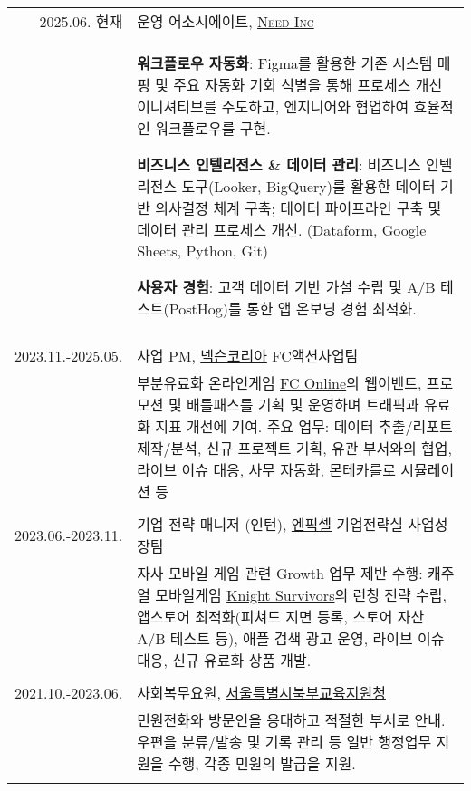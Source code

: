 \documentclass[a4paper]{article} %
\begin{document}
\begin{tabular}{r|p{11cm}}

    \textsc{2025.06.-현재} & 운영 어소시에이트, \href{https://www.need.ai}{\textsc{Need Inc}} \\
    &\footnotesize{\vspace{-2mm}
        \textbf{워크플로우 자동화}: Figma를 활용한 기존 시스템 매핑
        및 주요 자동화 기회 식별을 통해 프로세스 개선 이니셔티브를 주도하고,
        엔지니어와 협업하여 효율적인 워크플로우를 구현.

        \vspace{2mm}

        \textbf{비즈니스 인텔리전스 \& 데이터 관리}: 비즈니스 인텔리전스 도구(Looker, BigQuery)를 활용한
        데이터 기반 의사결정 체계 구축; 데이터 파이프라인 구축 및 데이터 관리 프로세스 개선.
        (Dataform, Google Sheets, Python, Git)

        \vspace{2mm}
        \textbf{사용자 경험}: 고객 데이터 기반 가설 수립 및 A/B 테스트(PostHog)를 통한 앱 온보딩 경험 최적화.
    }\\
    \multicolumn{2}{c}{} \\

    \textsc{2023.11.-2025.05.} & 사업 PM, \href{https://company.nexon.com/ko/}{넥슨코리아} FC액션사업팀 \\
    &\footnotesize{\vspace{-2mm}
        부분유료화 온라인게임 \href{https://fconline.nexon.com}{FC Online}의 웹이벤트, 프로모션 및 배틀패스를
        기획 및 운영하며 트래픽과 유료화 지표 개선에 기여. 
        주요 업무: 데이터 추출/리포트 제작/분석, 신규 프로젝트 기획, 유관 부서와의 협업,
                라이브 이슈 대응, 사무 자동화, 몬테카를로 시뮬레이션 등
    }\\
    \multicolumn{2}{c}{} \\
	
    \textsc{2023.06.-2023.11.} & 기업 전략 매니저 (인턴),
\href{https://npixel.co.kr/}{엔픽셀} 기업전략실 사업성장팀 \\
&\footnotesize{
    자사 모바일 게임 관련 Growth 업무 제반 수행:
    캐주얼 모바일게임 \href{https://pixelcraft.metapixel.io/}{Knight Survivors}의 런칭 전략 수립,
    앱스토어 최적화(피쳐드 지면 등록, 스토어 자산 A/B 테스트 등),
    애플 검색 광고 운영, 라이브 이슈 대응, 신규 유료화 상품 개발.
} \\
	\multicolumn{2}{c}{} \\
	
	\textsc{2021.10.-2023.06.} & 사회복무요원, \href{http://bbedu.sen.go.kr}{\textsc{서울특별시북부교육지원청}} \emph{}\\
	&\footnotesize{민원전화와 방문인을 응대하고 적절한 부서로 안내. 우편을 분류/발송 및 기록 관리 등 일반 행정업무 지원을 수행, 각종 민원의 발급을 지원.}\\
	\multicolumn{2}{c}{} \\
	

\end{tabular}
\end{document}
